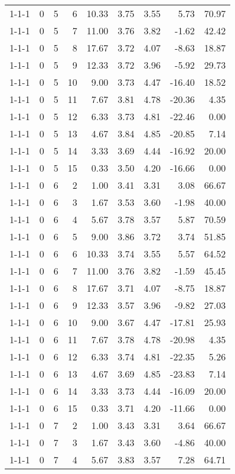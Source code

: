 \begin{tabular}{lrrrrrrrr}
1-1-1 & 0 & 5 & 6 & 10.33 & 3.75 & 3.55 & 5.73 & 70.97 \\
1-1-1 & 0 & 5 & 7 & 11.00 & 3.76 & 3.82 & -1.62 & 42.42 \\
1-1-1 & 0 & 5 & 8 & 17.67 & 3.72 & 4.07 & -8.63 & 18.87 \\
1-1-1 & 0 & 5 & 9 & 12.33 & 3.72 & 3.96 & -5.92 & 29.73 \\
1-1-1 & 0 & 5 & 10 & 9.00 & 3.73 & 4.47 & -16.40 & 18.52 \\
1-1-1 & 0 & 5 & 11 & 7.67 & 3.81 & 4.78 & -20.36 & 4.35 \\
1-1-1 & 0 & 5 & 12 & 6.33 & 3.73 & 4.81 & -22.46 & 0.00 \\
1-1-1 & 0 & 5 & 13 & 4.67 & 3.84 & 4.85 & -20.85 & 7.14 \\
1-1-1 & 0 & 5 & 14 & 3.33 & 3.69 & 4.44 & -16.92 & 20.00 \\
1-1-1 & 0 & 5 & 15 & 0.33 & 3.50 & 4.20 & -16.66 & 0.00 \\
1-1-1 & 0 & 6 & 2 & 1.00 & 3.41 & 3.31 & 3.08 & 66.67 \\
1-1-1 & 0 & 6 & 3 & 1.67 & 3.53 & 3.60 & -1.98 & 40.00 \\
1-1-1 & 0 & 6 & 4 & 5.67 & 3.78 & 3.57 & 5.87 & 70.59 \\
1-1-1 & 0 & 6 & 5 & 9.00 & 3.86 & 3.72 & 3.74 & 51.85 \\
1-1-1 & 0 & 6 & 6 & 10.33 & 3.74 & 3.55 & 5.57 & 64.52 \\
1-1-1 & 0 & 6 & 7 & 11.00 & 3.76 & 3.82 & -1.59 & 45.45 \\
1-1-1 & 0 & 6 & 8 & 17.67 & 3.71 & 4.07 & -8.75 & 18.87 \\
1-1-1 & 0 & 6 & 9 & 12.33 & 3.57 & 3.96 & -9.82 & 27.03 \\
1-1-1 & 0 & 6 & 10 & 9.00 & 3.67 & 4.47 & -17.81 & 25.93 \\
1-1-1 & 0 & 6 & 11 & 7.67 & 3.78 & 4.78 & -20.98 & 4.35 \\
1-1-1 & 0 & 6 & 12 & 6.33 & 3.74 & 4.81 & -22.35 & 5.26 \\
1-1-1 & 0 & 6 & 13 & 4.67 & 3.69 & 4.85 & -23.83 & 7.14 \\
1-1-1 & 0 & 6 & 14 & 3.33 & 3.73 & 4.44 & -16.09 & 20.00 \\
1-1-1 & 0 & 6 & 15 & 0.33 & 3.71 & 4.20 & -11.66 & 0.00 \\
1-1-1 & 0 & 7 & 2 & 1.00 & 3.43 & 3.31 & 3.64 & 66.67 \\
1-1-1 & 0 & 7 & 3 & 1.67 & 3.43 & 3.60 & -4.86 & 40.00 \\
1-1-1 & 0 & 7 & 4 & 5.67 & 3.83 & 3.57 & 7.28 & 64.71 \\

\end{tabular}
